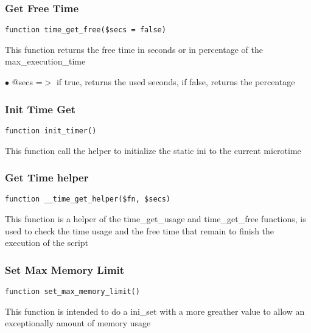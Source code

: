 \documentclass[a4paper]{article}
\begin{document}
\hypertarget{toc169}{}
\subsubsection{Get Free Time}

\begin{lstlisting}
function time_get_free($secs = false)
\end{lstlisting}

This function returns the free time in seconds or in percentage of the max\_execution\_time

\begin{compactitem}
\item[\color{myblue}$\bullet$] @secs =$>$ if true, returns the used seconds, if false, returns the percentage
\end{compactitem}

\hypertarget{toc170}{}
\subsubsection{Init Time Get}

\begin{lstlisting}
function init_timer()
\end{lstlisting}

This function call the helper to initialize the static ini to the current microtime

\hypertarget{toc171}{}
\subsubsection{Get Time helper}

\begin{lstlisting}
function __time_get_helper($fn, $secs)
\end{lstlisting}

This function is a helper of the time\_get\_usage and time\_get\_free functions, is used to
check the time usage and the free time that remain to finish the execution of the script

\hypertarget{toc172}{}
\subsubsection{Set Max Memory Limit}

\begin{lstlisting}
function set_max_memory_limit()
\end{lstlisting}

This function is intended to do a ini\_set with a more greather value to allow an
exceptionally amount of memory usage
\end{document}
